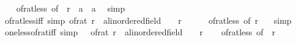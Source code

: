 \begin{isabellebody}
%
\isadelimproof
\ \ %
\endisadelimproof
%
\isatagproof
{}\isamarkupfalse%
\ of{\isacharunderscore}{\kern0pt}rat{\isacharunderscore}{\kern0pt}less\ {\isacharbrackleft}{\kern0pt}of\ {}\ r{\isacharcomma}{\kern0pt}\ \ {\isacharprime}{\kern0pt}a\ {\isacharequal}{\kern0pt}\ {\isacharprime}{\kern0pt}a{\isacharbrackright}{\kern0pt}\ \isamarkupfalse%
\ simp%
\endisatagproof
{\isafoldproof}%
%
\isadelimproof
\isanewline
%
\endisadelimproof
\isanewline
{}\isamarkupfalse%
\ of{\isacharunderscore}{\kern0pt}rat{\isacharunderscore}{\kern0pt}less{\isacharunderscore}{\kern0pt}{}{\isacharunderscore}{\kern0pt}iff\ {\isacharbrackleft}{\kern0pt}simp{\isacharbrackright}{\kern0pt}{\isacharcolon}{\kern0pt}\ {\isachardoublequoteopen}{\isacharparenleft}{\kern0pt}of{\isacharunderscore}{\kern0pt}rat\ r\ {\isacharcolon}{\kern0pt}{\isacharcolon}{\kern0pt}\ {\isacharprime}{\kern0pt}a{\isacharcolon}{\kern0pt}{\isacharcolon}{\kern0pt}linordered{\isacharunderscore}{\kern0pt}field{\isacharparenright}{\kern0pt}\ {\isacharless}{\kern0pt}\ {}\ {\isasymlongleftrightarrow}\ r\ {\isacharless}{\kern0pt}\ {}{\isachardoublequoteclose}\isanewline
%
\isadelimproof
\ \ %
\endisadelimproof
%
\isatagproof
{}\isamarkupfalse%
\ of{\isacharunderscore}{\kern0pt}rat{\isacharunderscore}{\kern0pt}less\ {\isacharbrackleft}{\kern0pt}of\ r\ {}{\isacharbrackright}{\kern0pt}\ \isamarkupfalse%
\ simp%
\endisatagproof
{\isafoldproof}%
%
\isadelimproof
\isanewline
%
\endisadelimproof
\isanewline
{}\isamarkupfalse%
\ one{\isacharunderscore}{\kern0pt}less{\isacharunderscore}{\kern0pt}of{\isacharunderscore}{\kern0pt}rat{\isacharunderscore}{\kern0pt}iff\ {\isacharbrackleft}{\kern0pt}simp{\isacharbrackright}{\kern0pt}{\isacharcolon}{\kern0pt}\ {\isachardoublequoteopen}{}\ {\isacharless}{\kern0pt}\ {\isacharparenleft}{\kern0pt}of{\isacharunderscore}{\kern0pt}rat\ r\ {\isacharcolon}{\kern0pt}{\isacharcolon}{\kern0pt}\ {\isacharprime}{\kern0pt}a{\isacharcolon}{\kern0pt}{\isacharcolon}{\kern0pt}linordered{\isacharunderscore}{\kern0pt}field{\isacharparenright}{\kern0pt}\ {\isasymlongleftrightarrow}\ {}\ {\isacharless}{\kern0pt}\ r{\isachardoublequoteclose}\isanewline
%
\isadelimproof
\ \ %
\endisadelimproof
%
\isatagproof
{}\isamarkupfalse%
\ of{\isacharunderscore}{\kern0pt}rat{\isacharunderscore}{\kern0pt}less\ {\isacharbrackleft}{\kern0pt}of\ {}\ r{\isacharbrackright}{\kern0pt}\ \isamarkupfalse%

\end{isabellebody}
